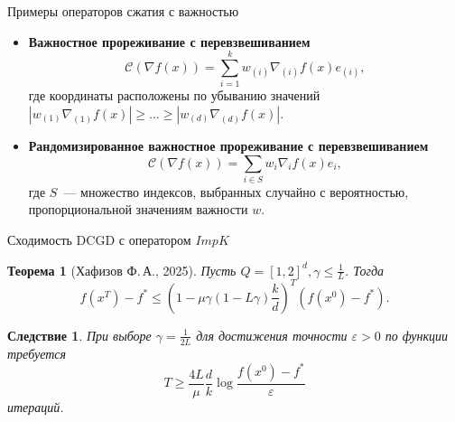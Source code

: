 \documentclass{beamer}
\newtheorem{mytheorem}{Теорема}
\newtheorem{mycorollary}{Следствие}
\begin{document}
\begin{frame}{Примеры операторов сжатия с важностью}
    \begin{itemize}
        \item \textbf{Важностное прореживание с перевзвешиванием}\\
        \begin{equation}
            \mathcal{C}(\nabla f(x)) = \sum_{i=1}^k w_{(i)} \nabla_{(i)} f(x) e_{(i)},
        \end{equation}
        где координаты расположены по убыванию значений $|w_{(1)} \nabla_{(1)} f(x)| \geq \dots \geq |w_{(d)} \nabla_{(d)} f(x)|$.
        \item \textbf{Рандомизированное важностное прореживание с перевзвешиванием}\\
        \begin{equation}
            \mathcal{C}(\nabla f(x)) = \sum_{i \in S} w_i \nabla_i f(x) e_i,
        \end{equation}
        где $S$~--- множество индексов, выбранных случайно с вероятностью, пропорциональной значениям важности $w$.
    \end{itemize}
\end{frame}


\begin{frame}{Сходимость DCGD с оператором $ImpK$}
    \begin{mytheorem}[Хафизов Ф.\,А., 2025]
        Пусть $Q = [1, 2]^d, \gamma \leq \frac{1}{L}$. Тогда
        \begin{equation}
            f(x^T) - f^* \leq \left(1 - \mu \gamma \left(1 - L \gamma\right) \frac{k}{d} \right)^T (f(x^0) - f^*).
        \end{equation}
    \end{mytheorem}
    \begin{mycorollary}
        При выборе $\gamma = \frac{1}{2L}$ для достижения точности $\varepsilon > 0$ по функции требуется
        \begin{equation}
            T \geq \frac{4L}{\mu} \frac{d}{k} \log \frac{f(x^0) - f^*}{\varepsilon}
        \end{equation}
        итераций.
    \end{mycorollary}
\end{frame}
\end{document}
